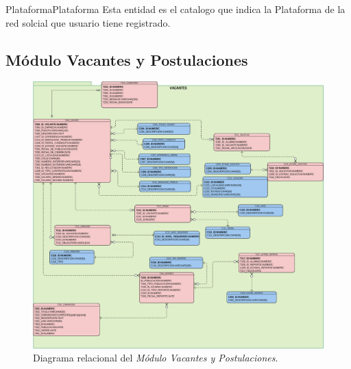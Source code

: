 \begin{cdtEntidad}{Plataforma}{Plataforma}{
    Esta entidad es el catalogo que indica la Plataforma de la red solcial que usuario tiene registrado.
}

\end{cdtEntidad}
\clearpage
\subsection{Módulo Vacantes y Postulaciones}

\begin{figure}[hbtp!]
    \begin{center}
        \includegraphics[width=1 \textwidth]{anexos/imagenes/MDVCT.png}
    \end{center}
    
    \caption{Diagrama relacional del \textit{Módulo Vacantes y Postulaciones}.}
    \label{adcu:grl}
\end{figure}



